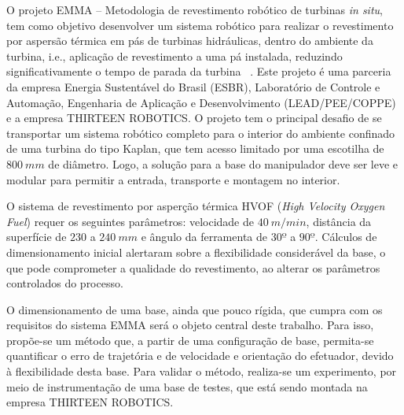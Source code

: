 O projeto EMMA -- Metodologia de revestimento robótico de turbinas \textit{in
situ}, tem como objetivo desenvolver um sistema robótico para realizar o
revestimento por aspersão térmica em pás de turbinas hidráulicas,
dentro do ambiente da turbina, i.e., aplicação de revestimento a uma pá
instalada, reduzindo significativamente o tempo de parada da turbina
~\citep{Freitas2017}.
Este projeto é uma parceria da empresa Energia Sustentável do Brasil (ESBR),
Laboratório de Controle e Automação, Engenharia de Aplicação e Desenvolvimento
(LEAD/PEE/COPPE) e a empresa THIRTEEN ROBOTICS. O projeto tem o principal
desafio de se transportar um sistema robótico completo para o interior do
ambiente confinado de uma turbina do tipo Kaplan, que tem acesso limitado por
uma escotilha de $800~mm$ de diâmetro. Logo, a solução para a base do
manipulador deve ser leve e modular para permitir a entrada, transporte e
montagem no interior.

O sistema de revestimento por asperção térmica HVOF (\textit{High Velocity
Oxygen Fuel}) requer os seguintes parâmetros: velocidade de $40~m/min$,
distância da superfície de $230$ a $240~mm$ e ângulo da ferramenta de $30º$
a $90º$.
Cálculos de dimensionamento inicial alertaram sobre a flexibilidade considerável da
base, o que pode comprometer a qualidade do revestimento, ao alterar os
parâmetros controlados do processo.

O dimensionamento de uma base, ainda que pouco rígida, que cumpra com os
requisitos do sistema EMMA será o objeto central deste trabalho. Para isso,
propõe-se um método que, a partir de uma configuração de base, permita-se
quantificar o erro de trajetória e de velocidade e orientação do efetuador,
devido à flexibilidade desta base. Para validar o método, realiza-se um
experimento, por meio de instrumentação de uma base de testes, que está sendo
montada na empresa THIRTEEN ROBOTICS.

